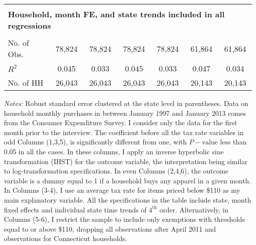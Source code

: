 \documentclass[12pt]{article}
\begin{document}
\begin{table}
\begin{threeparttable}
\begin{tabular}{lcccccc}
				& & & & & & \\
				\multicolumn{7}{l}{\textbf{Household, month FE, and state trends included in all regressions}}                                           \\
				&         &                         &         &         &                       &  \\
				No. of Obs.  				& 78,824 & 78,824 & 78,824 & 78,824 & 61,864 & 61,864 \\
				$R^2$                       & 0.045 & 0.033 & 0.045 & 0.033 & 0.047 & 0.034  \\
				No. of HH                   & 26,043 & 26,043 & 26,043 & 26,043 & 20,143 & 20,143  \\ \hline
			\end{tabular}
			\begin{tablenotes}
				\small \emph{Notes:}  Robust standard error clustered at the state level in parentheses. Data on household monthly purchases in between January 1997 and January 2013 comes from the Consumer Expenditure Survey. I consider only the data for the first month prior to the interview. The coefficient before all the tax rate variables in odd Columns (1,3,5), is significantly different from one, with $P-\text{value}$ less than 0.05 in all the cases. In these columns, I apply an inverse hyperbolic sine transformation (IHST) for the outcome variable, the interpretation being similar to log-transformation specifications. In even Columns (2,4,6), the outcome variable is a dummy equal to 1 if a household buys any apparel in a given month. In Columns (3-4), I use an average tax rate for items priced below \$110 as my main explanatory variable. All the specifications in the table include state, month fixed effects and individual state time trends of $4^\text{th}$ order. Alternatively,  in Columns (5-6), I restrict the sample to include only exemptions with thresholds equal to or above \$110, dropping all observations after April 2011 and observations for Connecticut households.  \\
			\end{tablenotes}
		\end{threeparttable}
	\end{table}
	
	
\end{document}
